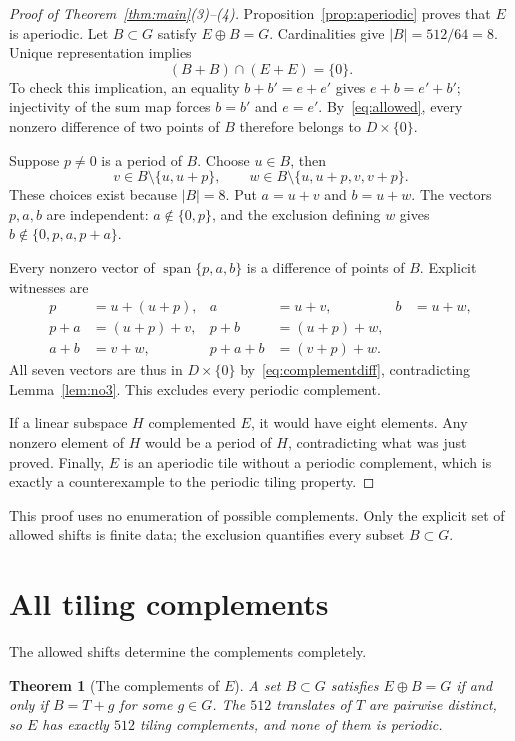 \documentclass[11pt]{article}
\newtheorem{theorem}{Theorem}
\theoremstyle{definition}\newtheorem{definition}[theorem]{Definition}
\theoremstyle{remark}\newtheorem{remark}[theorem]{Remark}
\newcommand{\Span}{\operatorname{span}}
\begin{document}
\begin{proof}[Proof of Theorem~\ref{thm:main}(3)--(4)]
Proposition~\ref{prop:aperiodic} proves that $E$ is aperiodic. Let $B\subset G$ satisfy $E\oplus B=G$. Cardinalities give $|B|=512/64=8$. Unique representation implies
\begin{equation}\label{eq:complementdiff}
(B+B)\cap(E+E)=\{0\}.
\end{equation}
To check this implication, an equality $b+b'=e+e'$ gives $e+b=e'+b'$; injectivity of the sum map forces $b=b'$ and $e=e'$. By~\eqref{eq:allowed}, every nonzero difference of two points of $B$ therefore belongs to $D\times\{0\}$.

Suppose $p\ne0$ is a period of $B$. Choose $u\in B$, then
\[
v\in B\setminus\{u,u+p\},\qquad
w\in B\setminus\{u,u+p,v,v+p\}.
\]
These choices exist because $|B|=8$. Put $a=u+v$ and $b=u+w$. The vectors $p,a,b$ are independent: $a\notin\{0,p\}$, and the exclusion defining $w$ gives
$b\notin\{0,p,a,p+a\}$.

Every nonzero vector of $\Span\{p,a,b\}$ is a difference of points of $B$. Explicit witnesses are
\begin{align*}
p&=u+(u+p),&a&=u+v,&b&=u+w,\\
p+a&=(u+p)+v,&p+b&=(u+p)+w,\\
a+b&=v+w,&p+a+b&=(v+p)+w.
\end{align*}
All seven vectors are thus in $D\times\{0\}$ by~\eqref{eq:complementdiff}, contradicting Lemma~\ref{lem:no3}. This excludes every periodic complement.

If a linear subspace $H$ complemented $E$, it would have eight elements. Any nonzero element of $H$ would be a period of $H$, contradicting what was just proved. Finally, $E$ is an aperiodic tile without a periodic complement, which is exactly a counterexample to the periodic tiling property.
\end{proof}

This proof uses no enumeration of possible complements. Only the explicit set of allowed shifts is finite data; the exclusion quantifies every subset $B\subset G$.

\section{All tiling complements}

The allowed shifts determine the complements completely.

\begin{theorem}[The complements of $E$]\label{thm:unique}
A set $B\subset G$ satisfies $E\oplus B=G$ if and only if $B=T+g$ for some $g\in G$. The $512$ translates of $T$ are pairwise distinct, so $E$ has exactly $512$ tiling complements, and none of them is periodic.
\end{theorem}
\end{document}
